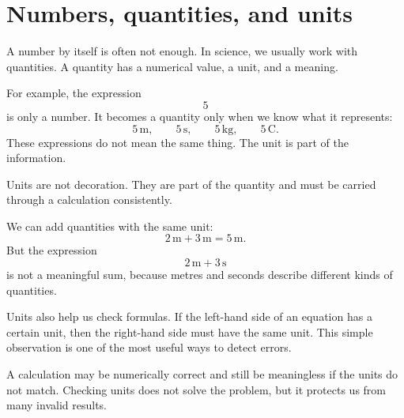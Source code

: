 \section{Numbers, quantities, and units}

A number by itself is often not enough. In science, we usually work with quantities. A quantity has a numerical value, a unit, and a meaning.

For example, the expression
\[
5
\]
is only a number. It becomes a quantity only when we know what it represents:
\[
5\,\mathrm{m}, \qquad 5\,\mathrm{s}, \qquad 5\,\mathrm{kg}, \qquad 5\,\mathrm{C}.
\]
These expressions do not mean the same thing. The unit is part of the information.

\begin{remarkbox}
Units are not decoration. They are part of the quantity and must be carried through a calculation consistently.
\end{remarkbox}

We can add quantities with the same unit:
\[
2\,\mathrm{m} + 3\,\mathrm{m} = 5\,\mathrm{m}.
\]
But the expression
\[
2\,\mathrm{m} + 3\,\mathrm{s}
\]
is not a meaningful sum, because metres and seconds describe different kinds of quantities.

Units also help us check formulas. If the left-hand side of an equation has a certain unit, then the right-hand side must have the same unit. This simple observation is one of the most useful ways to detect errors.

A calculation may be numerically correct and still be meaningless if the units do not match. Checking units does not solve the problem, but it protects us from many invalid results.
